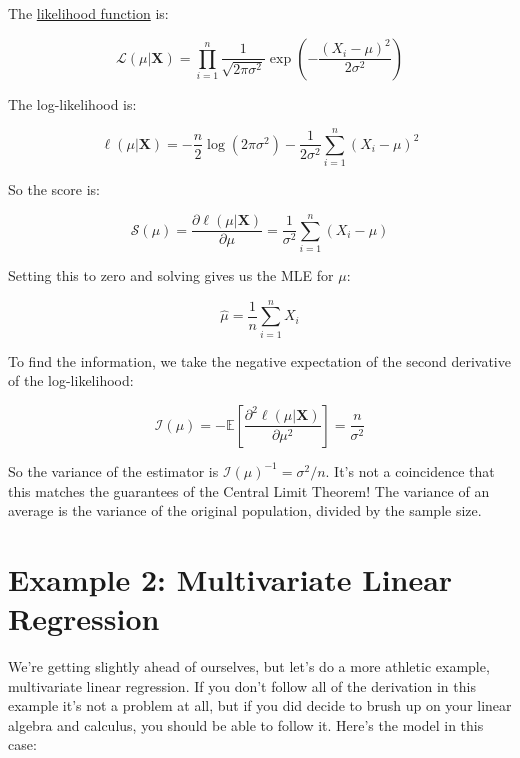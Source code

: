 \documentclass{article}
\begin{document}
The \href{https://en.wikipedia.org/wiki/Normal_distribution}{likelihood function} is:

\begin{equation}
\mathcal{L}(\mu|\mathbf{X}) = \prod_{i=1}^n \frac{1}{\sqrt{2\pi\sigma^2}} \exp\left(-\frac{(X_i - \mu)^2}{2\sigma^2}\right)
\end{equation}

The log-likelihood is:

\begin{equation}
\ell(\mu|\mathbf{X}) = -\frac{n}{2}\log(2\pi\sigma^2) - \frac{1}{2\sigma^2}\sum_{i=1}^n (X_i - \mu)^2
\end{equation}

So the score is:

\begin{equation}
\mathcal{S}(\mu) = \frac{\partial \ell(\mu|\boldsymbol{X})}{\partial \mu} = \frac{1}{\sigma^2}\sum_{i=1}^n (X_i - \mu)
\end{equation}

Setting this to zero and solving gives us the MLE for $\mu$:

\begin{equation}
\hat{\mu} = \frac{1}{n}\sum_{i=1}^n X_i
\end{equation}

To find the information, we take the negative expectation of the second derivative of the log-likelihood:

\begin{equation}
\mathcal{I}(\mu) = -\mathbb{E}\left[\frac{\partial^2 \ell(\mu|\mathbf{X})}{\partial \mu^2}\right] = \frac{n}{\sigma^2}
\end{equation}

So the variance of the estimator is $\mathcal{I}(\mu)^{-1} = \sigma^2/n$. It's not a coincidence that this matches the guarantees of the Central Limit Theorem! The variance of an average is the variance of the original population, divided by the sample size.

\section{Example 2: Multivariate Linear Regression}

We're getting slightly ahead of ourselves, but let's do a more athletic example, multivariate linear regression. If you don't follow all of the derivation in this example it's not a problem at all, but if you did decide to brush up on your linear algebra and calculus, you should be able to follow it. Here's the model in this case:
\end{document}
